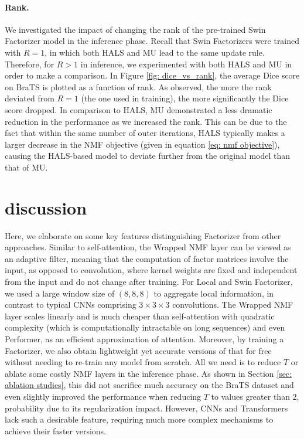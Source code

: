 \documentclass[a4,12pt]{article}
\begin{document}
	
	\paragraph{Rank.} 
	We investigated the impact of changing the rank of the pre-trained Swin Factorizer model in the inference phase. Recall that Swin Factorizers were trained with $ R = 1 $, in which both HALS and MU lead to the same update rule. Therefore, for $ R > 1 $ in inference, we experimented with both HALS and MU in order to make a comparison. In Figure \ref{fig: dice_vs_rank}, the average Dice score on BraTS is plotted as a function of rank. As observed, the more the rank deviated from $ R = 1 $ (the one used in training), the more significantly the Dice score dropped. In comparison to HALS, MU demonstrated a less dramatic reduction in the performance as we increased the rank. This can be due to the fact that within the same number of outer iterations, HALS typically makes a larger decrease in the NMF objective (given in equation \eqref{eq: nmf objective}), causing the HALS-based model to deviate further from the original model than that of MU. 
	
	
	\section{discussion} \label{sec: discussion}
	
	Here, we elaborate on some key features distinguishing Factorizer from other approaches. Similar to self-attention, the Wrapped NMF layer can be viewed as an adaptive filter, meaning that the computation of factor matrices involve the input, as opposed to convolution, where kernel weights are fixed and independent from the input and do not change after training. For Local and Swin Factorizer, we used a large window size of $ (8, 8, 8) $ to aggregate local information, in contrast to typical CNNs comprising $ 3 \times 3 \times 3 $ convolutions. The Wrapped NMF layer scales linearly and is much cheaper than self-attention with quadratic complexity (which is computationally intractable on long sequences) and even Performer, as an efficient approximation of attention. Moreover, by training a Factorizer, we also obtain lightweight yet accurate versions of that for free without needing to re-train any model from scratch. All we need is to reduce $ T $ or ablate some costly NMF layers in the inference phase. As shown in Section \ref{sec: ablation studies}, this did not sacrifice much accuracy on the BraTS dataset and even slightly improved the performance when reducing $ T $ to values greater than 2, probability due to its regularization impact. However, CNNs and Transformers lack such a desirable feature, requiring much more complex mechanisms to achieve their faster versions. 
	
\end{document}
